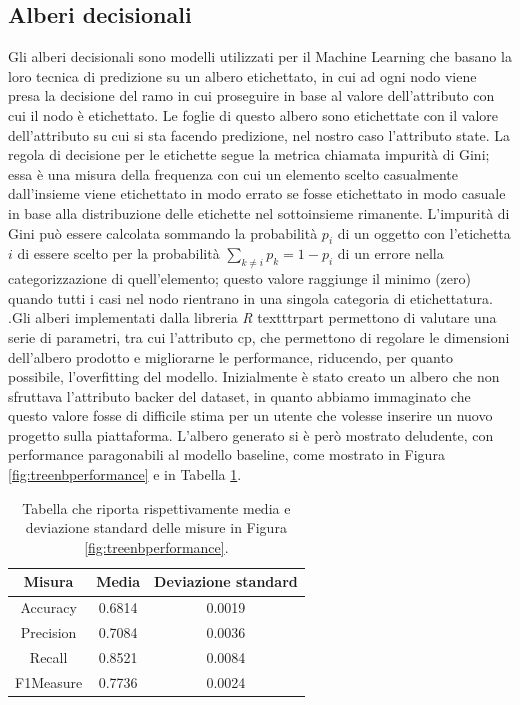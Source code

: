 \subsection{Alberi decisionali}
Gli alberi decisionali sono modelli utilizzati per il Machine Learning che basano la loro tecnica di predizione su un albero etichettato, in cui ad ogni nodo viene presa la decisione del ramo in cui proseguire in base al valore dell'attributo con cui il nodo è etichettato. Le foglie di questo albero sono etichettate con il valore dell'attributo su cui si sta facendo predizione, nel nostro caso l'attributo state. La regola di decisione per le etichette segue la metrica chiamata impurità di Gini; essa è una misura della frequenza con cui un elemento scelto casualmente dall'insieme viene etichettato in modo errato se fosse etichettato in modo casuale in base alla distribuzione delle etichette nel sottoinsieme rimanente. L'impurità di Gini può essere calcolata sommando la probabilità $p_i$ di un oggetto con l'etichetta $i$ di essere scelto per la probabilità $ \sum\limits_{k\neq i} p_{k}=1-p_{i} $ di un errore nella categorizzazione di quell'elemento; questo valore raggiunge il minimo (zero) quando tutti i casi nel nodo rientrano in una singola categoria di etichettatura. .Gli alberi implementati dalla libreria \emph{R} texttt{rpart} permettono di valutare una serie di parametri, tra cui l'attributo cp, che permettono di regolare le dimensioni dell'albero prodotto e migliorarne le performance, riducendo, per quanto possibile, l'overfitting del modello.
Inizialmente è stato creato un albero che non sfruttava l'attributo backer del dataset, in quanto abbiamo immaginato che questo valore fosse di difficile stima per un utente che volesse inserire un nuovo progetto sulla piattaforma. L'albero generato si è però mostrato deludente, con performance paragonabili al modello baseline, come mostrato in Figura \ref{fig:treenbperformance} e in Tabella \ref{tab:treenbperformance}.
\begin{table}
	\caption{Tabella che riporta rispettivamente media e deviazione standard delle misure in Figura \ref{fig:treenbperformance}.}
	\label{tab:treenbperformance}
	\centering
	\begin{tabular}{c|cc}
		Misura & Media & Deviazione standard \\
		\hline
		Accuracy & 0.6814 & 0.0019 \\ 
		Precision & 0.7084 & 0.0036 \\
		Recall & 0.8521 & 0.0084 \\
		F1Measure & 0.7736 & 0.0024 \\
	\end{tabular}
\end{table}
